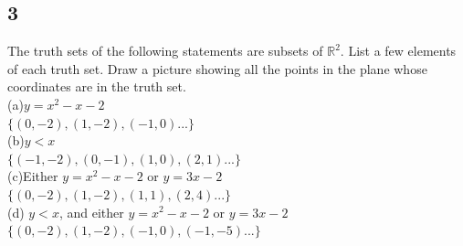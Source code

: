 \documentclass{article}
\begin{document}
\subsection{3}
The truth sets of the following statements are subsets of $\mathds{R}^2$. List a few elements of each truth set. Draw a picture showing all the points in the plane whose coordinates are in the truth set.\\
(a)$y=x^2-x-2$\\
$\{(0,-2),(1,-2),(-1,0)...\}$ $ $\\
(b)$y<x$\\
$\{(-1,-2),(0,-1),(1,0),(2,1)...\}$ $ $\\
(c)Either $y=x^2-x-2$ or $y=3x-2$\\
$\{(0,-2),(1,-2),(1,1),(2,4)...\}$ $ $\\
(d) $y<x$, and either $y=x^2-x-2$ or $y=3x-2$\\
$\{(0,-2),(1,-2),(-1,0),(-1,-5)...\}$ $ $\\
\newpage
\end{document}
